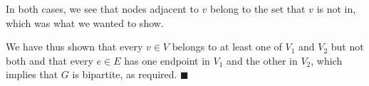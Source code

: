 \documentclass{article}
\renewcommand{\(}{\left(}
\renewcommand{\)}{\right)}
\theoremstyle{plain}
\theoremstyle{plain}
\theoremstyle{definition}
\begin{document}
\begin{shaded}
        In both cases, we see that nodes adjacent to $v$ belong to the set that $v$ is not in, which was what we wanted to show.

        \vspace{4mm}




        We have thus shown that every $v\in V$ belongs to at least one of $V_{1}$ and $V_{2}$ but not both and that every $e\in E$ has one endpoint in $V_{1}$ and the other in $V_{2}$, which implies that $G$ is bipartite, as required. $\blacksquare$ 
    \end{shaded}
\end{document}
